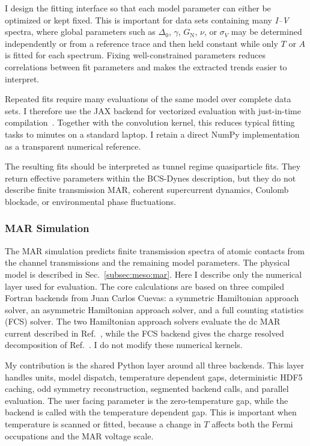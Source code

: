             I design the fitting interface so that each model parameter can either be optimized or kept fixed. This is important for data sets containing many \textit{I--V} spectra, where global parameters such as $\Delta_0$, $\gamma$, $G_\mathrm{N}$, $\nu$, or $\sigma_V$ may be determined independently or from a reference trace and then held constant while only $T$ or $A$ is fitted for each spectrum. Fixing well-constrained parameters reduces correlations between fit parameters and makes the extracted trends easier to interpret.

            Repeated fits require many evaluations of the same model over complete data sets. I therefore use the JAX backend for vectorized evaluation with just-in-time compilation~\cite{jax2018github}. Together with the convolution kernel, this reduces typical fitting tasks to minutes on a standard laptop. I retain a direct NumPy implementation as a transparent numerical reference.

            The resulting fits should be interpreted as tunnel regime quasiparticle fits. They return effective parameters within the BCS-Dynes description, but they do not describe finite transmission MAR, coherent supercurrent dynamics, Coulomb blockade, or environmental phase fluctuations.

        \subsubsection*{MAR Simulation}

            The MAR simulation predicts finite transmission spectra of atomic contacts from the channel transmissions and the remaining model parameters. The physical model is described in Sec.~\ref{subsec:meso:mar}. Here I describe only the numerical layer used for evaluation. The core calculations are based on three compiled Fortran backends from Juan Carlos Cuevas: a symmetric Hamiltonian approach solver, an asymmetric Hamiltonian approach solver, and a full counting statistics (FCS) solver. The two Hamiltonian approach solvers evaluate the dc MAR current described in Ref.~\cite{cuevas_hamiltonian_1996}, while the FCS backend gives the charge resolved decomposition of Ref.~\cite{cuevas_full_2003}. I do not modify these numerical kernels.

            My contribution is the shared Python layer around all three backends. This layer handles units, model dispatch, temperature dependent gaps, deterministic HDF5 caching, odd symmetry reconstruction, segmented backend calls, and parallel evaluation. The user facing parameter is the zero-temperature gap, while the backend is called with the temperature dependent gap. This is important when temperature is scanned or fitted, because a change in $T$ affects both the Fermi occupations and the MAR voltage scale.

